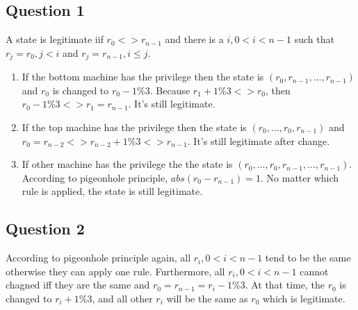 \documentclass{article}
\begin{document}
\subsection*{Question 1}
A state is legitimate iif $r_0 <> r_{n-1}$ and there is a $i, 0<i<n-1$ such that $r_j=r_0, j<i$ and $r_j=r_{n-1}, i\le j $.
\begin{enumerate}
  \item If the bottom machine has the privilege then the state is $(r_0,r_{n-1},...,r_{n-1})$ and $r_0$ is changed to $r_0-1\%3$. Because $r_1+1\%3<>r_0$, then $r_0-1\%3 <> r_1 = r_{n-1}$. It's still legitimate.

  \item If the top machine has the privilege then the state is $(r_0,...,r_0,r_{n-1})$ and $r_0=r_{n-2}<>r_{n-2}+1\%3<>r_{n-1}$. It's still legitimate after change.

  \item If other machine has the privilege the the state is $(r_0,...,r_0,r_{n-1},...,r_{n-1})$. According to pigeonhole principle, $abs(r_0-r_{n-1}) = 1$. No matter which rule is applied, the state is still legitimate.
\end{enumerate}

\subsection*{Question 2}
According to pigeonhole principle again, all $r_i, 0<i<{n-1}$ tend to be the same otherwise they can apply one rule. Furthermore, all $r_i, 0<i<{n-1}$ cannot chagned iff they are the same and $r_0=r_{n-1}=r_i-1\%3$. At that time, the $r_0$ is changed to $r_i+1\%3$, and all other $r_i$ will be the same as $r_0$ which is legitimate.
\end{document}
